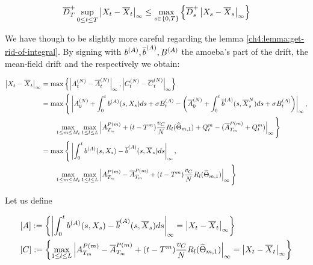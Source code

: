 	\begin{equation}
	\overline{D}_T^+ \sup_{0 \leq t \leq T} \left| X_t-\overline{X}_t \right|_\infty
	\leq
	\max_{ s\in \{0,T\} } \left\{ 
	\overline{D}^+_s \left| X_s-\overline{X}_s \right|_\infty
	\right\}
\end{equation}

We have though to be slightly more careful regarding the lemma \ref{ch4:lemma:get-rid-of-integral}.
By signing with $b^{(A)}, \overline{b}^{(A)}, B^{(A)}$ the amoeba's part of the drift, the mean-field drift and the \Bm respectively we obtain:

\begin{align*}
	\left| X_t-\overline{X}_t \right|_\infty 
	&= \max \left\{
	\left| A_t^{(N)} - \overline{A}_t^{(N)} \right|_\infty,
	\left| C_t^{(N)}  - \overline{C}_t^{(N)} \right|_\infty
	\right\}
	\\
	&= \max \Bigg\{
	\left| 
		A_0^{(N)} 
		+ \int_0^t b^{(A)} (s, X_s) d s
		+ 
		\sigma B_t^{(A)}
		-
		\left(
		\overline{A}_0^{(N)} 
		+ \int_0^t \overline{b}^{(A)}(s, \overline{X}_s^N) d s
		+ 
		\sigma B_t^{(A)}
		\right)
	 \right|_\infty,
	\\
	&\qquad
	\max_{1\leq m \leq M_t}
	\max_{1\leq l \leq L}
	\left| 
		A_{T_{m}}^{P(m)}  
		+ (t - T^{m})\frac{v_C}{N}  R_l (\widehat{\Theta}_{m,1})
		+ Q_t^m
		- (\overline{A}_{T_{m}}^{P(m)}  + Q_t^m)
	 \right|_\infty
	\Bigg\}
	\\
	&=
	\max \Bigg\{
	\left| 
		\int_0^t b^{(A)}(s, X_s) - \overline{b}^{(A)}(s, \overline{X}_s) d s
	 \right|_\infty,	
	\\
	&\qquad
	\max_{1\leq m \leq M_t}	
	\max_{1\leq l \leq L}
	\left| 
		A_{T_{m}}^{P(m)} 
		- \overline{A}_{T_{m}}^{P(m)}
		+ (t - T^{m})\frac{v_C}{N}  R_l (\widehat{\Theta}_{m,1})
	 \right|_\infty
	\Bigg\}
\end{align*}

Let us define

\begin{align*}
	&[A] := \left\{ \left| 
		\int_0^t b^{(A)}(s, X_s) - \overline{b}^{(A)}(s, \overline{X}_s) d s
	 \right|_\infty = \left| X_t-\overline{X}_t \right|_\infty \right\}
	\qquad
	\\
	&
	[C] := \left\{ \max_{1\leq l \leq L}
	\left| 
		A_{T_{m}}^{P(m)} 
		- \overline{A}_{T_{m}}^{P(m)}
		+ (t - T^{m}) \frac{v_C}{N}  R_l (\widehat{\Theta}_{m,1})
	 \right|_\infty = \left| X_t-\overline{X}_t \right|_\infty \right\}
\end{align*}

